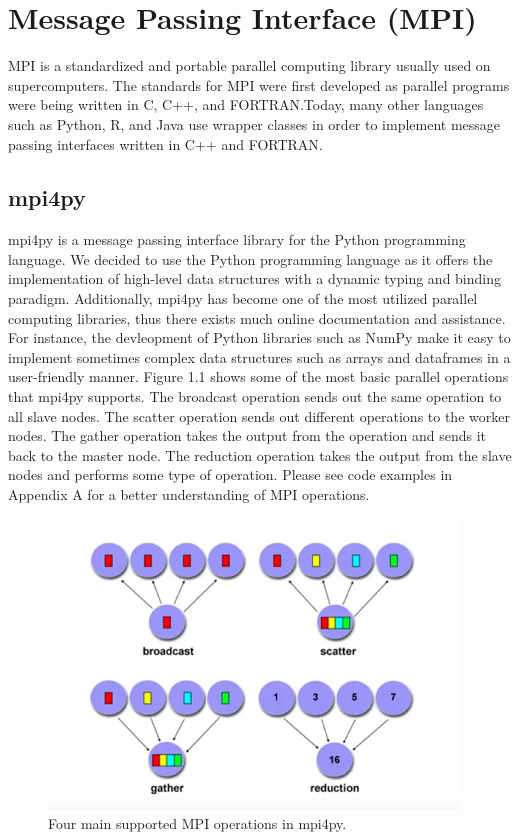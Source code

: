 
\section{Message Passing Interface (MPI)}

	MPI is a standardized and portable parallel computing library usually used on supercomputers. The standards for MPI were first developed as parallel programs were being written in C, C++, and FORTRAN.Today, many other languages such as Python, R, and Java use wrapper classes in order to implement message passing interfaces written in C++ and FORTRAN.

\subsection{mpi4py}
	mpi4py is a message passing interface library for the Python programming language. We decided to use the Python programming language as it offers the implementation of high-level data structures with a dynamic typing and binding paradigm. Additionally, mpi4py has become one of the most utilized parallel computing libraries, thus there exists much online documentation and assistance. For instance, the devleopment of Python libraries such as NumPy make it easy to implement sometimes complex data structures such as arrays and dataframes in a user-friendly manner. Figure 1.1 shows some of the most basic parallel operations that mpi4py supports. The broadcast operation sends out the same operation to all slave nodes. The scatter operation sends out different operations to the worker nodes. The gather operation takes the output from the operation and sends it back to the master node. The reduction operation takes the output from the slave nodes and performs some type of operation. Please see code examples in Appendix A for a better understanding of MPI operations.
	
	
\begin{figure}
\centering
\includegraphics{Figures/mpi-diagram}
\decoRule
\caption[MPI Operations]{Four main supported MPI operations in mpi4py.}
\label{fig:MPI Operations}
\end{figure}


